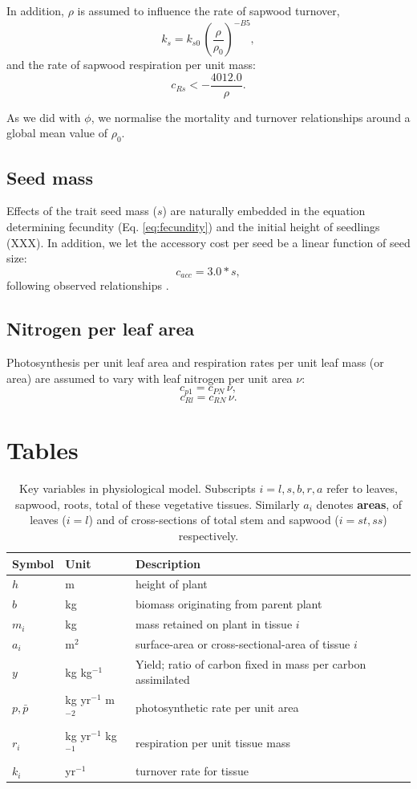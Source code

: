 \documentclass[10pt,twoside]{article}
\begin{document}
In addition, $\rho$ is assumed to influence the rate of sapwood turnover, 
$$k_s=k_{s0} \, \left(\frac{\rho}{\rho_0}\right)^ {-B5},$$
and the rate of sapwood respiration per unit mass:
$$c_{Rs} <- \frac{4012.0}{\rho}.$$

As we did with $\phi$, we normalise the mortality and turnover 
relationships around a global mean value of $\rho_0$. 

\subsection{Seed mass}

Effects of the trait seed mass ($s$) are naturally embedded in the equation determining 
fecundity (Eq. \ref{eq:fecundity}) and the initial height of seedlings (XXX). In addition,
we let the accessory cost per seed be a linear function of seed size:
$$c_{acc} = 3.0 * s,$$
following observed relationships \citep{Henery-2001}.

\subsection{Nitrogen per leaf area}

Photosynthesis per unit leaf area and respiration rates per unit leaf mass (or area) 
are assumed to vary with leaf nitrogen per unit area $\nu$:
$$c_{p1}=c_{PN} \, \nu,$$
$$c_{Rl}=c_{RN}  \, \nu.$$

\clearpage

\section{Tables}\label{tables}

\begin{table}[ht]
 \caption{Key variables in physiological model. 
 Subscripts $i=l,s,b,r,a$ refer to leaves, sapwood, roots, total of these vegetative tissues. Similarly $a_i$ denotes \textbf{areas}, of leaves ($i=l$) and of cross-sections of total stem and sapwood ($i= st,ss$) respectively.}
\centering
  \begin{tabular}{p{2cm}p{2cm}p{7cm}}
  \hline
  Symbol & Unit & Description \\
  \hline
  $h$   & m  & height of plant\\
  $b$   & kg  & biomass originating from parent plant\\
  $m_i$ & kg  & mass retained on plant in tissue $i$\\
  $a_i$ & m$^2$  & surface-area or cross-sectional-area of tissue $i$\\
  $y$ & kg kg$^{-1}$ & Yield; ratio of carbon fixed in mass per carbon assimilated \\
  $p,\bar{p}$ & kg yr$^{-1}$ m$^{-2}$  & photosynthetic rate per unit area \\
  $r_i$ & kg yr$^{-1}$ kg$^{-1}$  & respiration per unit tissue mass \\
  $k_i$ & yr$^{-1}$ & turnover rate for tissue \\
  \hline
  \end{tabular}
\label{tab:definitions}
\end{table}
\end{document}
